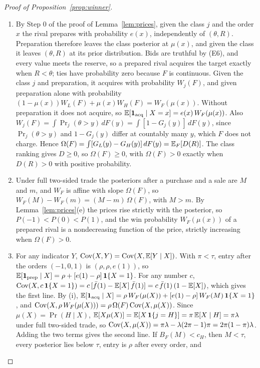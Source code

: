 \begin{proof}[Proof of Proposition~\ref{prop:winner}]
\begin{enumerate}[label=(\roman*),leftmargin=2em]
\item By Step 0 of the proof of Lemma~\ref{lem:prices}, given the class \(j\) and the order \(x\) the rival
prepares with probability \(e(x)\), independently of \((\theta,R)\). Preparation therefore leaves the class posterior
at \(\mu(x)\), and given the class it leaves \((\theta,R)\) at its prior distribution. Bids are truthful by (E6), and every value
meets the reserve, so a prepared rival acquires the target exactly when \(R<\theta\); ties have probability zero
because \(F\) is continuous. Given the class \(j\) and preparation, it acquires with probability \(W_j(F)\), and given
preparation alone with probability \((1-\mu(x))W_L(F)+\mu(x)W_H(F)=W_F(\mu(x))\). Without preparation it does not
acquire, so \(\mathbb{E}[\mathbf{1}_{\rm acq}\mid X=x]=e(x)\,W_F(\mu(x))\). Also \(W_j(F)=\int\Pr_j(\theta>y)\,dF(y)=\int[1-G_j(y)]\,dF(y)\),
since \(\Pr_j(\theta>y)\) and \(1-G_j(y)\) differ at countably many \(y\), which \(F\) does not charge. Hence
\(\Omega(F)=\int[G_L(y)-G_H(y)]\,dF(y)=\mathbb{E}_F[D(R)]\). The class ranking gives \(D\ge0\), so \(\Omega(F)\ge0\), with
\(\Omega(F)>0\) exactly when \(D(R)>0\) with positive probability.
\item Under full two-sided trade the posteriors after a purchase and a sale are \(M\) and \(m\), and \(W_F\) is affine
with slope \(\Omega(F)\), so \(W_F(M)-W_F(m)=(M-m)\,\Omega(F)\), with \(M>m\). By Lemma~\ref{lem:prices}(e) the prices
rise strictly with the posterior, so \(P(-1)<P(0)<P(1)\), and the win probability \(W_F(\mu(x))\) of a prepared
rival is a nondecreasing function of the price, strictly increasing when \(\Omega(F)>0\).
\item For any indicator \(Y\), \(\operatorname{Cov}(X,Y)=\operatorname{Cov}(X,\mathbb{E}[Y\mid X])\). With \(\pi<\tau\), entry after the orders
\((-1,0,1)\) is \((\rho,\rho,e(1))\), so \(\mathbb{E}[\mathbf{1}_{\rm prep}\mid X]=\rho+[e(1)-\rho]\,\mathbf{1}\{X=1\}\). For any number \(c\),
\(\operatorname{Cov}(X,c\,\mathbf{1}\{X=1\})=c\,[\bar f(1)-\mathbb{E}[X]\,\bar f(1)]=c\,\bar f(1)\,(1-\mathbb{E}[X])\), which gives the first line. By (i),
\(\mathbb{E}[\mathbf{1}_{\rm acq}\mid X]=\rho\,W_F(\mu(X))+[e(1)-\rho]\,W_F(M)\,\mathbf{1}\{X=1\}\), and
\(\operatorname{Cov}(X,\rho\,W_F(\mu(X)))=\rho\,\Omega(F)\operatorname{Cov}(X,\mu(X))\). Since \(\mu(X)=\Pr(H\mid X)\),
\(\mathbb{E}[X\mu(X)]=\mathbb{E}[X\,\mathbf{1}\{j=H\}]=\pi\,\mathbb{E}[X\mid H]=\pi\lambda\) under full two-sided trade, so
\(\operatorname{Cov}(X,\mu(X))=\pi\lambda-\lambda(2\pi-1)\pi=2\pi(1-\pi)\lambda\). Adding the two terms gives the second line. If
\(B_F(M)<c_H\), then \(M<\tau\), every posterior lies below \(\tau\), entry is \(\rho\) after every order, and

\end{enumerate}
\end{proof}
